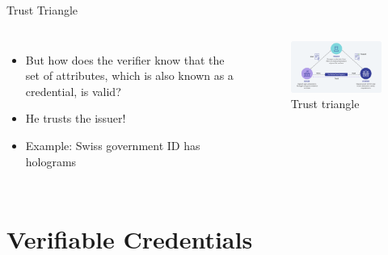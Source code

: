 \documentclass[
	english,%
	authorontitle=true,
	]{bfhbeamer}
\begin{document}
\begin{frame}{Trust Triangle}
    \begin{columns}[onlytextwidth,T]
        \column{70mm}  
        
        \begin{itemize}
            \item But how does the verifier know that the set of attributes, which is also known as a credential, is valid?
            \item He trusts the issuer!
            \item Example: Swiss government ID has holograms
        \end{itemize}

        \column{70mm}

        \begin{figure}
            \centering
            \includegraphics[width=70mm]{./img/trusttriangle.png}
            \caption{Trust triangle}
        \end{figure}
        
    \end{columns}
\end{frame}

\section{Verifiable Credentials}
\end{document}
